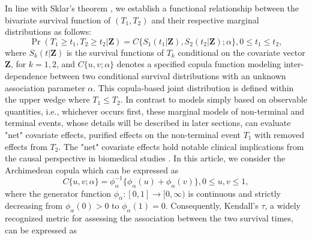\documentclass[APA,Times1COL]{WileyNJDv5} %
\theoremstyle{plain}
\def\bfZ{\mathbf{Z}}
\def\Pr{\operatorname{Pr}}
\begin{document}
In line with Sklar’s theorem \citep{sklar1959}, we establish a functional relationship between the bivariate survival function of $(T_1, T_2)$ and their respective marginal distributions as follows:
\begin{equation}
\Pr (T_1\geq t_1, T_2\geq t_2| \bfZ) = C\{S_1(t_1|\bfZ),S_2(t_2|\bfZ);\alpha\}, 0\leq t_1\leq t_2,
\label{model:jointdist}
\end{equation} 
where $S_k(t|\bfZ)$ is the survival functions of $T_k$ conditional on the covariate vector $\bfZ$, for $k=1,2$,  and $C\{u,v;\alpha\}$ denotes a specified copula function modeling inter-dependence between two conditional survival distributions with an unknown association parameter $\alpha$. This copula-based joint distribution is defined within the upper wedge where $T_1\leq T_2$. In contrast to models simply based on observable quantities, i.e., whichever occurs first, these marginal models of non-terminal and terminal events, whose details will be described in later sections, can evaluate "net" covariate effects, purified effects on the non-terminal event $T_1$ with removed effects from $T_2$.  The  "net" covariate effects hold notable clinical implications from the causal perspective in biomedical studies \citep{Ding2009artificial,chen2010}. 
In this article, we consider the Archimedean copula which can be expressed as
\begin{equation}
    C\{u,v;\alpha\} = \phi_{\alpha}^{-1}\{\phi_{\alpha}(u)+\phi_{\alpha}(v)\}, 0\leq u,v\leq 1,
    \label{model:arcm}
\end{equation}
where the generator function $\phi_{\alpha}: [0,1]\rightarrow [0,\infty)$ is continuous and strictly decreasing from $\phi_{\alpha}(0)>0$ to $\phi_{\alpha}(1)=0$. %
Consequently, Kendall’s $\tau$, a widely recognized metric for assessing the association between the two survival times, can be expressed as \citep{lakhal2008}
\end{document}
